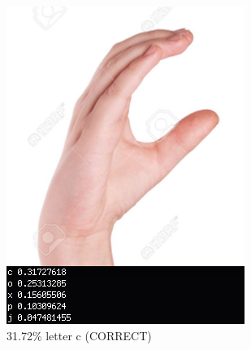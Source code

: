 \documentclass[journal]{./IEEE/IEEEtran}
\begin{document}
\begin{figure}[ht!]
    \centering
    \includegraphics[width=1\linewidth]{./images/c_sample.png}
    \caption{31.72\% letter c (CORRECT)}
    \label{fig:c_sample}
\end{figure}
\end{document}
